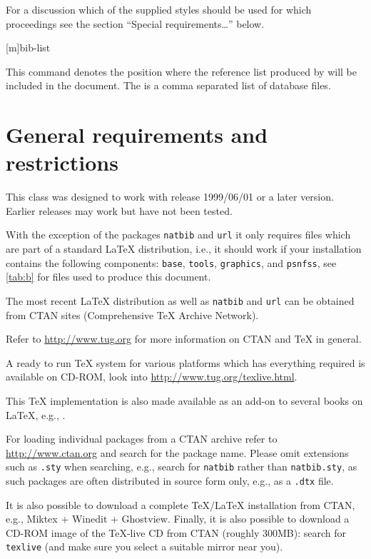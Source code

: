 For a discussion which of the supplied \BibTeX{} styles should be used
for which proceedings see the section ``Special requirements\ldots''
below.

[m]{bib-list}

This command denotes the position where the reference list produced by
\BibTeX{} will be included in the document. The  is a
comma separated list of \BibTeX{} database files.

\section{General requirements and restrictions}

This class was designed to work with \LaTeXe{} release 1999/06/01 or a
later version. Earlier releases may work but have not been tested.

With the exception of the packages \texttt{natbib} and \texttt{url} it
only requires files which are part of a standard \LaTeX{}
distribution, i.e., it should work if your installation contains the
following components:
\texttt{base}, \texttt{tools}, \texttt{graphics}, and \texttt{psnfss},
see \vref{tab:b} for files used to produce this document.

The most recent \LaTeX{} distribution as well as \texttt{natbib} and
\texttt{url} can be obtained from CTAN sites (Comprehensive \TeX{}
Archive Network).

Refer to \url{http://www.tug.org} for more information on CTAN and
\TeX{} in general.

A ready to run \TeX{} system for various platforms which has
everything required is available on CD-ROM, look into
\url{http://www.tug.org/texlive.html}.

This \TeX{} implementation is also made available as an add-on to
several books on \LaTeX, e.g., \cite{A-W:KD04,A-W:MG04}.

For loading individual packages from a CTAN archive refer to
\url{http://www.ctan.org} and search for the package name. Please omit
extensions such as \texttt{.sty} when searching, e.g., search for
\texttt{natbib} rather than \texttt{natbib.sty}, as such packages are
often distributed in source form only, e.g., as a \texttt{.dtx} file.

It is also possible to download a complete \TeX/\LaTeX{} installation
from CTAN, e.g., Miktex + Winedit + Ghostview. Finally, it is also
possible to download a CD-ROM image of the \TeX-live CD from CTAN
(roughly 300MB): search for \texttt{texlive} (and make sure you select
a suitable mirror near you).

